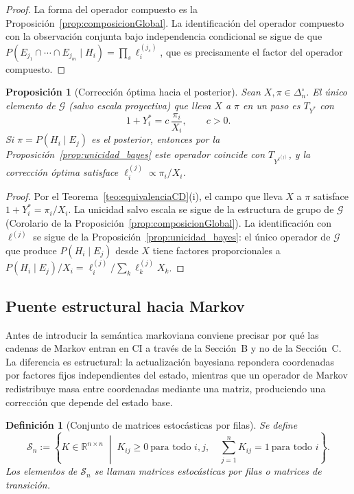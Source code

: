 ﻿\documentclass[12pt]{article}
\newtheorem{definicion}{Definición}[section]
\newtheorem{proposicion}{Proposición}[section]
\begin{document}
\begin{proof}
La forma del operador compuesto es la Proposición~\ref{prop:composicionGlobal}. La identificación del operador compuesto con la observación conjunta bajo independencia condicional se sigue de que $P(E_{j_1}\cap\cdots\cap E_{j_m}\mid H_i) = \prod_s\ell^{(j_s)}_i$, que es precisamente el factor del operador compuesto.
\end{proof}

\begin{proposicion}[Corrección óptima hacia el posterior]\label{prop:correccion_optima_bayes}
Sean $X,\pi\in\Delta_n^\circ$. El único elemento de $\mathcal{G}$ (salvo escala proyectiva) que lleva $X$ a $\pi$ en un paso es $T_{Y^*}$ con
\[
1+Y^*_i = c\,\frac{\pi_i}{X_i}, \qquad c>0.
\]
Si $\pi = P(H_i\mid E_j)$ es el posterior, entonces por la Proposición~\ref{prop:unicidad_bayes} este operador coincide con $T_{Y^{\ell^{(j)}}}$, y la corrección óptima satisface $\ell^{(j)}_i \propto \pi_i/X_i$.
\end{proposicion}

\begin{proof}
Por el Teorema~\ref{teo:equivalenciaCD}(i), el campo que lleva $X$ a $\pi$ satisface $1+Y^*_i = \pi_i/X_i$. La unicidad salvo escala se sigue de la estructura de grupo de $\mathcal{G}$ (Corolario de la Proposición~\ref{prop:composicionGlobal}). La identificación con $\ell^{(j)}$ se sigue de la Proposición~\ref{prop:unicidad_bayes}: el único operador de $\mathcal{G}$ que produce $P(H_i\mid E_j)$ desde $X$ tiene factores proporcionales a $P(H_i\mid E_j)/X_i = \ell^{(j)}_i/\sum_k\ell^{(j)}_k X_k$.
\end{proof}

\subsection{Puente estructural hacia Markov}

Antes de introducir la semántica markoviana conviene precisar por qué las cadenas de Markov entran en CI a través de la Sección~B y no de la Sección~C. La diferencia es estructural: la actualización bayesiana repondera coordenadas por factores fijos independientes del estado, mientras que un operador de Markov redistribuye masa entre coordenadas mediante una matriz, produciendo una corrección que depende del estado base.

\begin{definicion}[Conjunto de matrices estocásticas por filas]\label{def:Sn_markov}
Se define
\[
\mathcal{S}_n
:=
\left\{
K\in\mathbb{R}^{n\times n}
\;\middle|\;
K_{ij}\ge 0\ \text{para todo } i,j,
\quad
\sum_{j=1}^n K_{ij}=1\ \text{para todo } i
\right\}.
\]
Los elementos de $\mathcal{S}_n$ se llaman \emph{matrices estocásticas por filas} o \emph{matrices de transición}.
\end{definicion}
\end{document}
